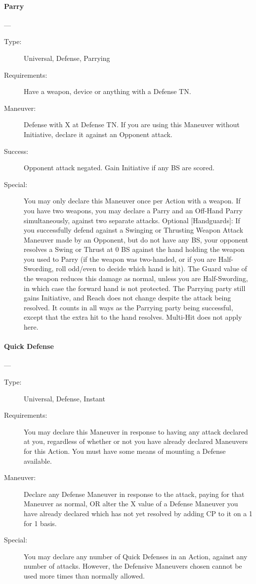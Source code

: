 \documentclass[oneside,11pt,english]{book}
\begin{document}
\paragraph{\large\label{man:Parry}Parry}---\quad{\large[X]}
\vspace{-10pt}\begin{description} 
\item [Type:] Universal, Defense, Parrying 
\item [Requirements:] Have a weapon, device or anything with a Defense TN. 
\item [Maneuver:] Defense with X at Defense TN. If you are using this Maneuver without Initiative, declare it 
against an Opponent attack. 
\item [Success:] Opponent attack negated. Gain Initiative if any BS are scored. 
\item [Special:] You may only declare this Maneuver once per Action with a weapon. If you have two weapons, 
you may declare a Parry and an Off-Hand Parry simultaneously, against two separate attacks. 
Optional [Handguards]: If you successfully defend against a Swinging or Thrusting Weapon Attack 
Maneuver made by an Opponent, but do not have any BS, your opponent resolves a Swing or Thrust at 0 
BS against the hand holding the weapon you used to Parry (if the weapon was two-handed, or if you are 
Half-Swording, roll odd/even to decide which hand is hit). The Guard value of the weapon reduces this 
damage as normal, unless you are Half-Swording, in which case the forward hand is not protected. The 
Parrying party still gains Initiative, and Reach does not change despite the attack being resolved. It counts 
in all ways as the Parrying party being successful, except that the extra hit to the hand resolves. Multi-Hit 
does not apply here. 
\end{description}

\paragraph{\large\label{man:Quick Defense}Quick Defense}---\quad{\large[2]}
\vspace{-10pt}\begin{description} 
\item [Type:] Universal, Defense, Instant 
\item [Requirements:] You may declare this Maneuver in response to having any attack declared at you, 
regardless of whether or not you have already declared Maneuvers for this Action. You must have some 
means of mounting a Defense available. 
\item [Maneuver:] Declare any Defense Maneuver in response to the attack, paying for that Maneuver as 
normal, OR alter the X value of a Defense Maneuver you have already declared which has not yet 
resolved by adding CP to it on a 1 for 1 basis. 
\item [Special:] You may declare any number of Quick Defenses in an Action, against any number of attacks. 
However, the Defensive Maneuvers chosen cannot be used more times than normally allowed. 
\end{description}
\end{document}
